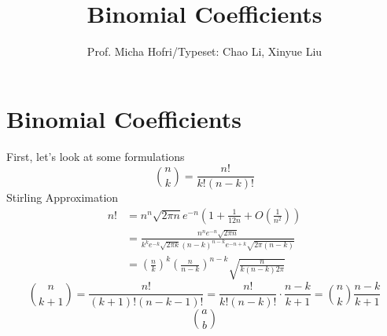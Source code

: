 \documentclass[11pt]{article}
\author{Prof. Micha Hofri/Typeset:  Chao Li, Xinyue Liu}
\title{Binomial Coefficients}
\begin{document}
\maketitle
\section*{Binomial Coefficients}
First, let's look at some formulations \\
\[
\binom{n}{k}=\frac{n!}{k!(n-k)!}
\]
Stirling Approximation \\
\begin{align*}
n!&=n^n\sqrt{2\pi n}e^{-n}\left(1+\frac{1}{12n}+O\left(\frac{1}{n^2}\right)\right) \\
&=\frac{n^ne^{-n}\sqrt{2\pi n}}{k^ke^{-k}\sqrt{2\pi k}(n-k)^{n-k}e^{-n+k}\sqrt{2\pi (n-k)}} \\
&=\left(\frac{n}{k}\right)^k\left(\frac{n}{n-k}\right)^{n-k}\sqrt{\frac{n}{k(n-k)2\pi}}
\end{align*}
\[
\binom{n}{k+1}=\frac{n!}{(k+1)!(n-k-1)!}=\frac{n!}{k!(n-k)!}\cdot \frac{n-k}{k+1}=\binom{n}{k}\frac{n-k}{k+1}
\]
\[
\binom{a}{b}
\]
\end{document}
